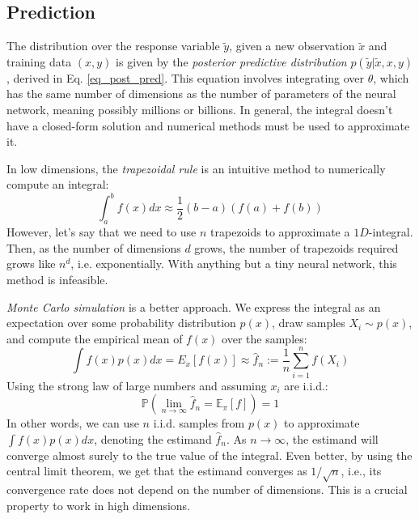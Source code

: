 \documentclass[12pt]{article}
\begin{document}
\subsection{Prediction}
\label{sec_prediction}

The distribution over the response variable $\tilde{y}$, given a new observation $\tilde{x}$ and training data $(x, y)$ is given by the \textit{posterior predictive distribution} $p(\tilde{y} | \tilde{x}, x, y)$, derived in Eq. \ref{eq_post_pred}. This equation involves integrating over $\theta$, which has the same number of dimensions as the number of parameters of the neural network, meaning possibly millions or billions. In general, the integral doesn't have a closed-form solution and numerical methods must be used to approximate it.

In low dimensions, the \textit{trapezoidal rule} is an intuitive method to numerically compute an integral:
\begin{equation}
\int_{a}^{b} f(x) d x \approx \frac{1}{2}(b-a)(f(a)+f(b))
\end{equation}
However, let's say that we need to use $n$ trapezoids to approximate a $1D$-integral. Then, as the number of dimensions $d$ grows, the number of trapezoids required grows like $n^d$, i.e. exponentially. With anything but a tiny neural network, this method is infeasible.

\textit{Monte Carlo simulation} is a better approach. We express the integral as an expectation over some probability distribution $p(x)$, draw samples $X_i \sim p(x)$, and compute the empirical mean of $f(x)$ over the samples:
\begin{equation}
\int f(x)p(x) dx = E_x[f(x)] \approx \hat{f}_n := \frac{1}{n} \sum_{i=1}^n f(X_i)
\end{equation}
Using the strong law of large numbers and assuming $x_i$ are i.i.d.:
\begin{equation}
\mathbb{P}\left(\lim_{n \rightarrow \infty} \hat{f}_n = \mathbb{E}_{\pi}[f]\right)=1
\end{equation}
In other words, we can use $n$ i.i.d. samples from $p(x)$ to approximate $\int f(x)p(x) dx$, denoting the estimand $\hat{f}_n$. As $n \rightarrow \infty$, the estimand will converge almost surely to the true value of the integral. Even better, by using the central limit theorem, we get that the estimand converges as $1/\sqrt n$, i.e., its convergence rate does not depend on the number of dimensions. This is a crucial property to work in high dimensions.
\end{document}
